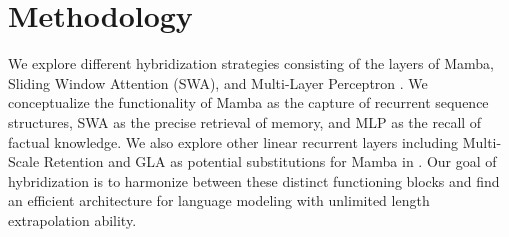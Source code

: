 \documentclass{article}
\begin{document}







\section{Methodology} \label{meth}

We explore different hybridization strategies consisting of the layers of Mamba, Sliding Window Attention (SWA), and Multi-Layer Perceptron \citep{shazeer2020glu,dauphin2016language}. We conceptualize the functionality of Mamba as the capture of recurrent sequence structures, SWA as the precise retrieval of memory, and MLP as the recall of factual knowledge. We also explore other linear recurrent layers including Multi-Scale Retention \citep{sun2023retentive} and GLA \citep{yang2023gated} as potential substitutions for Mamba in . Our goal of hybridization is to harmonize between these distinct functioning blocks and find an efficient architecture for language modeling with unlimited length extrapolation ability.
\end{document}
